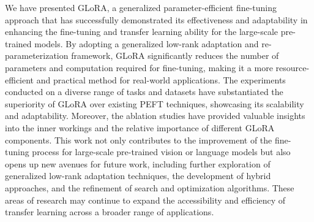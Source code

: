 We have presented GLoRA, a generalized parameter-efficient fine-tuning approach that has successfully demonstrated its effectiveness and adaptability in enhancing the fine-tuning and transfer learning ability for the large-scale pre-trained models. By adopting a generalized low-rank adaptation and re-parameterization framework, GLoRA significantly reduces the number of parameters and computation required for fine-tuning, making it a more resource-efficient and practical method for real-world applications. The experiments conducted on a diverse range of tasks and datasets have substantiated the superiority of GLoRA over existing PEFT techniques, showcasing its scalability and adaptability. Moreover, the ablation studies have provided valuable insights into the inner workings and the relative importance of different GLoRA components. This work not only contributes to the improvement of the fine-tuning process for large-scale pre-trained vision or language models but also opens up new avenues for future work, including further exploration of generalized low-rank adaptation techniques, the development of hybrid approaches, and the refinement of search and optimization algorithms. These areas of research may continue to expand the accessibility and efficiency of transfer learning across a broader range of applications.


